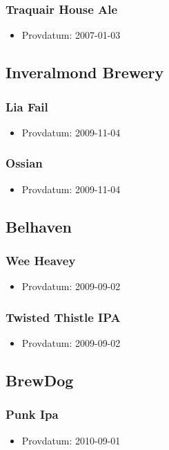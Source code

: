 \documentclass[11pt]{article}
\begin{document}
\subsubsection{Traquair House Ale}
\label{sec:orgcd35c36}
\begin{itemize}
\item Provdatum: 2007-01-03
\end{itemize}
\subsection{Inveralmond Brewery}
\label{sec:orgb44273a}
\subsubsection{Lia Fail}
\label{sec:org359db5f}
\begin{itemize}
\item Provdatum: 2009-11-04
\end{itemize}
\subsubsection{Ossian}
\label{sec:orgcee1f68}
\begin{itemize}
\item Provdatum: 2009-11-04
\end{itemize}
\subsection{Belhaven}
\label{sec:org2169e3d}
\subsubsection{Wee Heavey}
\label{sec:org81ab5bb}
\begin{itemize}
\item Provdatum: 2009-09-02
\end{itemize}
\subsubsection{Twisted Thistle IPA}
\label{sec:org025e3a4}
\begin{itemize}
\item Provdatum: 2009-09-02
\end{itemize}
\subsection{BrewDog}
\label{sec:orgbce0f06}
\subsubsection{Punk Ipa}
\label{sec:org8188c7a}
\begin{itemize}
\item Provdatum: 2010-09-01
\end{itemize}
\end{document}
